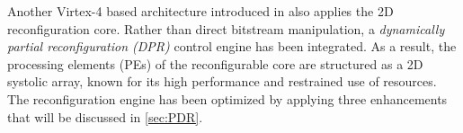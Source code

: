 
Another Virtex-4 based architecture introduced in \cite{PDR} also applies the 2D reconfiguration core. Rather than direct bitstream manipulation, a \emph{dynamically partial reconfiguration (DPR)} control engine has been integrated. As a result, the processing elements (PEs) of the reconfigurable core are structured as a 2D systolic array, known for its high performance and restrained use of resources. The reconfiguration engine has been optimized by applying three enhancements that will be discussed in \ref{sec:PDR}.